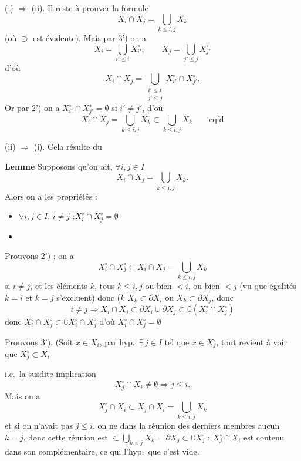 \documentclass[11pt,a4paper]{article}
\begin{document}
(i) $\Longrightarrow$ (ii). Il reste à prouver la formule
\[
X_i \cap X_j = \bigcup_{k \leq i, j} X_k
\]
(où $\supset$ est évidente). Mais par 3') on a
\[
X_i = \bigcup_{i' \leq i} X_{i'}^\circ , \qquad X_j = \bigcup_{j' \leq j} X_{j'}^\circ
\]
d'où
\[
X_i \cap X_j = \bigcup_{\substack{i' \leq i \\ j' \leq j}} X_{i'}^\circ \cap X_{j'}^\circ .
\]
Or par 2') on a $X_{i'}^\circ \cap X_{j'}^\circ = \emptyset$ 
si $i' \neq j'$, d'où
\[
X_i \cap X_j = \bigcup_{k \leq i, j} X_k^\circ \subset \bigcup_{k \leq i, j} X_k
\qquad \text{cqfd}
\]

(ii) $\Longrightarrow$ (i). Cela résulte du

\textbf{Lemme}  Supposons qu'on ait, $\forall i, j \in I$
\[
X_i \cap X_j = \bigcup_{k \leq i, j} X_k .
\]
Alors on a les propriétés :
\begin{itemize}
  \item[2')] $\forall i, j \in I$, $i \neq j$ \struck{\ill{}} :\quad $X_i^\circ \cap X_j^\circ = \emptyset$
  \item[\struck{3')}] 
\end{itemize}

Prouvons 2') : on a
\[
X_i^\circ \cap X_j^\circ \subset X_i \cap X_j = \bigcup_{k \leq i, j} X_k
\]
si $i \neq j$,  et les éléments $k$, tous $k \leq i, j$  ou
bien $< i$, ou bien $< j$ (vu que  égalités $k = i$ et $k = j$
s'excluent) donc
($k$ \ill{} $X_k \subset \partial X_i$ ou $X_k \subset \partial X_j$, donc
\[
i \neq j \Longrightarrow X_i \cap X_j \subset \partial X_i \cup \partial X_j \subset \complement (X_i^\circ \cap X_j^\circ)
\]
donc $X_i^\circ \cap X_j^\circ \subset \complement X_i^\circ \cap X_j^\circ$
d'où $X_i^\circ \cap X_j^\circ = \emptyset$ 

Prouvons 3'). (Soit $x \in X_i$, par hyp.\ $\exists\, j \in I$ tel que
$x \in X_j^\circ$, tout revient à voir que $X_j^\circ \subset X_i$

i.e.\ la susdite implication
\[
X_j^\circ \cap X_i \neq \emptyset \Longrightarrow j \leq i .
\]
Mais on a
\[
X_j^\circ \cap X_i \subset X_j \cap X_i = \bigcup_{k \leq i, j} X_k
\]
et si on n'avait pas $j \leq i$, on ne  dans la
réunion des derniers membres aucun $k = j$, donc cette réunion est
$\subset \bigcup_{k < j} X_k = \partial X_j \subset \complement X_j^\circ$  :
$X_j^\circ \cap X_i$ est contenu dans son complémentaire, ce qui
 l'hyp.\ que c'est vide.
\end{document}
